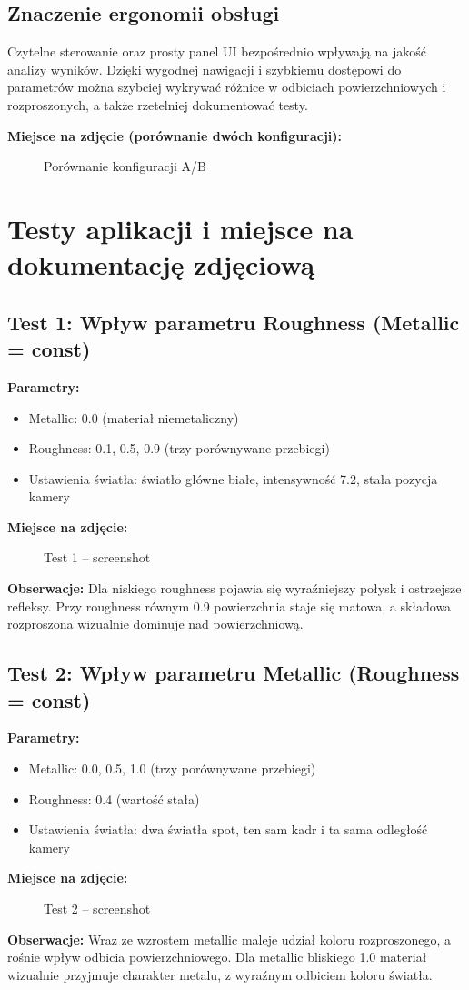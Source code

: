\documentclass[12pt,a4paper]{article}
\begin{document}
\subsection{Znaczenie ergonomii obsługi}
Czytelne sterowanie oraz prosty panel UI bezpośrednio wpływają na jakość analizy wyników. Dzięki wygodnej nawigacji i szybkiemu dostępowi do parametrów można szybciej wykrywać różnice w odbiciach powierzchniowych i rozproszonych, a także rzetelniej dokumentować testy.

\textbf{Miejsce na zdjęcie (porównanie dwóch konfiguracji):}
\begin{figure}[H]
\centering
\fbox{\rule{0pt}{6cm}\rule{0.9\linewidth}{0pt}}
\caption{Porównanie konfiguracji A/B}
\end{figure}

\section{Testy aplikacji i miejsce na dokumentację zdjęciową}
\subsection{Test 1: Wpływ parametru Roughness (Metallic = const)}
\textbf{Parametry:}
\begin{itemize}
  \item Metallic: 0.0 (materiał niemetaliczny)
  \item Roughness: 0.1, 0.5, 0.9 (trzy porównywane przebiegi)
  \item Ustawienia światła: światło główne białe, intensywność 7.2, stała pozycja kamery
\end{itemize}
\textbf{Miejsce na zdjęcie:}
\begin{figure}[H]
\centering
\fbox{\rule{0pt}{6cm}\rule{0.9\linewidth}{0pt}}
\caption{Test 1 -- screenshot}
\end{figure}
\textbf{Obserwacje:} Dla niskiego roughness pojawia się wyraźniejszy połysk i ostrzejsze refleksy. Przy roughness równym 0.9 powierzchnia staje się matowa, a składowa rozproszona wizualnie dominuje nad powierzchniową.

\subsection{Test 2: Wpływ parametru Metallic (Roughness = const)}
\textbf{Parametry:}
\begin{itemize}
  \item Metallic: 0.0, 0.5, 1.0 (trzy porównywane przebiegi)
  \item Roughness: 0.4 (wartość stała)
  \item Ustawienia światła: dwa światła spot, ten sam kadr i ta sama odległość kamery
\end{itemize}
\textbf{Miejsce na zdjęcie:}
\begin{figure}[H]
\centering
\fbox{\rule{0pt}{6cm}\rule{0.9\linewidth}{0pt}}
\caption{Test 2 -- screenshot}
\end{figure}
\textbf{Obserwacje:} Wraz ze wzrostem metallic maleje udział koloru rozproszonego, a rośnie wpływ odbicia powierzchniowego. Dla metallic bliskiego 1.0 materiał wizualnie przyjmuje charakter metalu, z wyraźnym odbiciem koloru światła.
\end{document}
